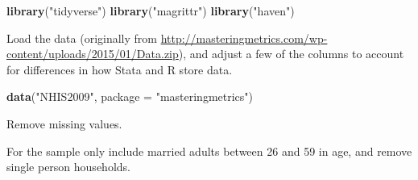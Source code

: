 \documentclass[]{book}
\newenvironment{Shaded}{\begin{snugshade}}{\end{snugshade}}
\newcommand{\DataTypeTok}[1]{\textcolor[rgb]{0.13,0.29,0.53}{#1}}
\newcommand{\DecValTok}[1]{\textcolor[rgb]{0.00,0.00,0.81}{#1}}
\newcommand{\KeywordTok}[1]{\textcolor[rgb]{0.13,0.29,0.53}{\textbf{#1}}}
\newcommand{\NormalTok}[1]{#1}
\newcommand{\OperatorTok}[1]{\textcolor[rgb]{0.81,0.36,0.00}{\textbf{#1}}}
\newcommand{\OtherTok}[1]{\textcolor[rgb]{0.56,0.35,0.01}{#1}}
\newcommand{\StringTok}[1]{\textcolor[rgb]{0.31,0.60,0.02}{#1}}
\theoremstyle{definition}
\theoremstyle{definition}
\theoremstyle{definition}
\theoremstyle{remark}
\begin{document}
\begin{Shaded}
\begin{Highlighting}[]
\KeywordTok{library}\NormalTok{(}\StringTok{"tidyverse"}\NormalTok{)}
\KeywordTok{library}\NormalTok{(}\StringTok{"magrittr"}\NormalTok{)}
\KeywordTok{library}\NormalTok{(}\StringTok{"haven"}\NormalTok{)}
\end{Highlighting}
\end{Shaded}

Load the data (originally from
\url{http://masteringmetrics.com/wp-content/uploads/2015/01/Data.zip}),
and adjust a few of the columns to account for differences in how Stata
and R store data.

\begin{Shaded}
\begin{Highlighting}[]
\KeywordTok{data}\NormalTok{(}\StringTok{"NHIS2009"}\NormalTok{, }\DataTypeTok{package =} \StringTok{"masteringmetrics"}\NormalTok{)}
\end{Highlighting}
\end{Shaded}

Remove missing values.

\begin{Shaded}
\end{Shaded}

For the sample only include married adults between 26 and 59 in age, and
remove single person households.

\begin{Shaded}
\end{Shaded}
\end{document}
